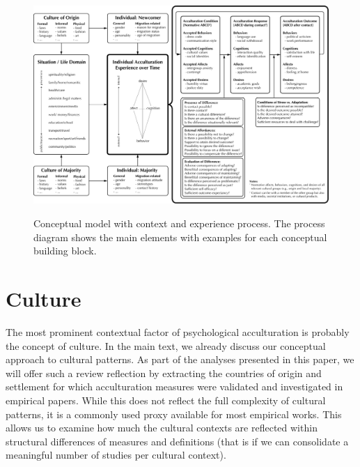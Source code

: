 \documentclass[man, 12pt, a4paper]{apa7}
\begin{document}
\begin{figure}
    \centering
    \caption{Conceptual model with context and experience process. The process diagram shows the main elements with examples for each conceptual building block.}
    \includegraphics[width=\textwidth]{Figures/ConceptualFrameworkExpandedOptima.pdf}
    \label{fig:SupModelContext}
\end{figure}

\section{Culture} 
The most prominent contextual factor of psychological acculturation is probably the concept of culture. In the main text, we already discuss our conceptual approach to cultural patterns. As part of the analyses presented in this paper, we will offer such a review reflection by extracting the countries of origin and settlement for which acculturation measures were validated and investigated in empirical papers. While this does not reflect the full complexity of cultural patterns, it is a commonly used proxy available for most empirical works. This allows us to examine how much the cultural contexts are reflected within structural differences of measures and definitions (that is if we can consolidate a meaningful number of studies per cultural context).
\end{document}
